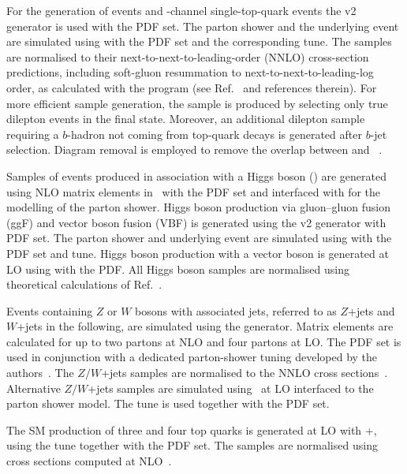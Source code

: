 For the generation of \ttbar events and \Wt-channel single-top-quark events the
\POWHEGBOX v2 generator is used with the  PDF set. The parton shower
and the underlying event are simulated using 
with the  PDF set and the corresponding
 tune.  The \ttbar samples are normalised to their
next-to-next-to-leading-order (NNLO) cross-section predictions, including soft-gluon
resummation to next-to-next-to-leading-log order, as calculated with the
 program (see Ref.~\cite{ref:xs6} and references therein).  For more
efficient sample generation, the \ttbar sample is produced by selecting only true
dilepton events in the final state.  Moreover, an additional dilepton \ttbar
sample requiring a $b$-hadron not coming from top-quark decays is generated
after $b$-jet selection. Diagram removal is employed to remove
the overlap between \ttbar and \Wt~\cite{Re:2010bp}.

Samples of \ttbar events produced in association with a Higgs boson (\ttH) 
are generated using NLO matrix elements in \MGAMC\ with
the  PDF set and interfaced with  for the modelling of the
parton shower.  Higgs boson production via gluon--gluon fusion (ggF) and vector
boson fusion (VBF) is generated using the \POWHEGBOX v2 generator with
 PDF set. The parton shower and underlying event are simulated using
 with the  PDF set and  tune.  Higgs boson
production with a vector boson is generated at LO using  with the
 PDF.  All Higgs boson samples are normalised using theoretical
calculations of Ref.~\cite{lhcxs}. 

Events containing $Z$ or $W$ bosons with associated jets, referred to as 
$Z$+jets and $W$+jets in the following, are simulated using the
 generator. Matrix elements are calculated for up to two partons at
NLO and four partons at LO.  The  PDF set is used in conjunction with
a dedicated parton-shower tuning developed by the \SHERPA authors~\cite{Gleisberg:2008ta}.  The
$Z/W$+jets samples are normalised to the NNLO cross
sections~\cite{Anastasiou:2003ds, Gavin:2010az, Gavin:2012sy, Li:2012wna}.
Alternative $Z/W$+jets samples
are simulated using \MGAMC\ at LO interfaced to the  parton shower
model. The  tune is used together with the  PDF set. 

The SM production of three and four top quarks is generated at LO with
\MGAMC+, using the  tune together with the
 PDF set. The samples are normalised using cross
sections computed at NLO~\cite{Barger:2010uw,Bevilacqua:2012em}.

